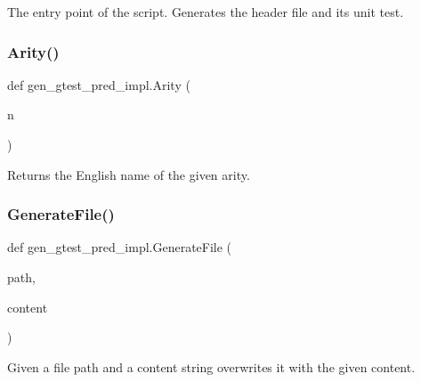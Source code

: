 \begin{DoxyVerb}The entry point of the script.  Generates the header file and its
unit test.\end{DoxyVerb}
 \mbox{\label{namespacegen__gtest__pred__impl_a5bbb7272f3588b969ab3ded6f49836a1}} 
\subsubsection{\texorpdfstring{Arity()}{Arity()}}
{\footnotesize\ttfamily def gen\+\_\+gtest\+\_\+pred\+\_\+impl.\+Arity (\begin{DoxyParamCaption}\item[{}]{n }\end{DoxyParamCaption})}

\begin{DoxyVerb}Returns the English name of the given arity.\end{DoxyVerb}
 \mbox{\label{namespacegen__gtest__pred__impl_a16210fe365dfd176e04aa2578ac5a8d9}} 
\subsubsection{\texorpdfstring{GenerateFile()}{GenerateFile()}}
{\footnotesize\ttfamily def gen\+\_\+gtest\+\_\+pred\+\_\+impl.\+Generate\+File (\begin{DoxyParamCaption}\item[{}]{path,  }\item[{}]{content }\end{DoxyParamCaption})}

\begin{DoxyVerb}Given a file path and a content string
   overwrites it with the given content.
\end{DoxyVerb}
 \mbox{\label{namespacegen__gtest__pred__impl_a6f3039a82a5283846fb272f8a3af6743}} 
